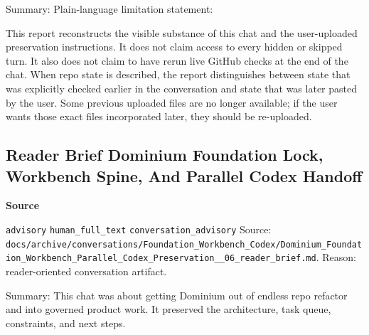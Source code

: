 \documentclass[9pt,a4paper,openany]{book}
\newcommand{\vonecallout}[3]{\par\medskip\noindent\begingroup\setlength{\fboxsep}{7pt}\colorbox{DomCalloutBg}{\parbox{0.94\linewidth}{\textbf{\textcolor{#1}{#2}}\par #3}}\endgroup\par\medskip}
\begin{document}
Summary: Plain-\allowbreak{}language limitation statement:


This report reconstructs the visible substance of this chat and the user-\allowbreak{}uploaded preservation instructions.\allowbreak{} It does not claim access to every hidden or skipped turn.\allowbreak{} It also does not claim to have rerun live GitHub checks at the end of the chat.\allowbreak{} When repo state is described, the report distinguishes between state that was explicitly checked earlier in the conversation and state that was later pasted by the user.\allowbreak{} Some previous uploaded files are no longer available; if the user wants those exact files incorporated later, they should be re-\allowbreak{}uploaded.\allowbreak{}



\subsection{Reader Brief Dominium Foundation Lock, Workbench Spine, And Parallel Codex Handoff}

\vonecallout{DomSlate}{Source}{\texttt{advisory} \texttt{human\_\allowbreak{}full\_\allowbreak{}text} \texttt{conversation\_\allowbreak{}advisory} Source: \texttt{docs/\allowbreak{}archive/\allowbreak{}conversations/\allowbreak{}Foundation\_\allowbreak{}Workbench\_\allowbreak{}Codex/\allowbreak{}Dominium\_\allowbreak{}Foundation\_\allowbreak{}Workbench\_\allowbreak{}Parallel\_\allowbreak{}Codex\_\allowbreak{}Preservation\_\allowbreak{}\_\allowbreak{}06\_\allowbreak{}reader\_\allowbreak{}brief.\allowbreak{}md}.\allowbreak{} Reason: reader-\allowbreak{}oriented conversation artifact.\allowbreak{}}

Summary: This chat was about getting Dominium out of endless repo refactor and into governed product work.\allowbreak{} It preserved the architecture, task queue, constraints, and next steps.\allowbreak{}
\end{document}

